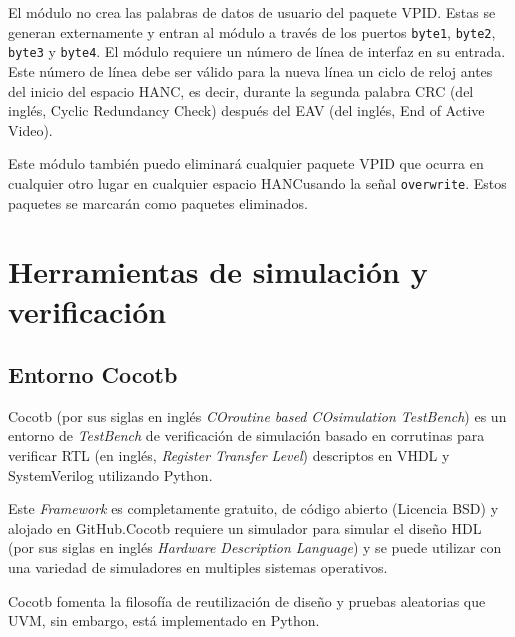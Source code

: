 El módulo no crea las palabras de datos de usuario del paquete VPID\@. Estas se
generan externamente y entran al módulo a través de los puertos \texttt{byte1},
\texttt{byte2}, \texttt{byte3} y \texttt{byte4}. El módulo requiere un número
de línea de interfaz en su entrada. Este número de línea debe ser válido para
la nueva línea un ciclo de reloj antes del inicio del espacio HANC, es decir,
durante la segunda palabra CRC  (del inglés, Cyclic Redundancy Check) después del EAV  (del inglés, End of Active Video)\@.

Este módulo también puedo eliminará cualquier paquete VPID que ocurra en
cualquier otro lugar en cualquier espacio HANC\@ usando la señal
\texttt{overwrite}. Estos paquetes se marcarán como paquetes eliminados. 




\section{Herramientas de simulación y verificación}

\subsection{Entorno Cocotb}

  Cocotb (por sus siglas en inglés \textit{COroutine based COsimulation
  TestBench}) es un entorno de \textit{TestBench} de verificación de simulación
  basado en corrutinas para verificar RTL (en inglés,
  \textit{Register Transfer Level}) descriptos en VHDL y SystemVerilog utilizando
  Python.

  Este \textit{Framework} es completamente gratuito, de código abierto (Licencia
  BSD) y alojado en GitHub.Cocotb requiere un simulador para simular el
  diseño HDL (por sus siglas en inglés \textit{Hardware Description Language}) y
  se puede utilizar con una variedad de simuladores en multiples sistemas
  operativos.

  Cocotb fomenta la filosofía de reutilización de diseño y pruebas
  aleatorias que UVM, sin embargo, está implementado en Python.

